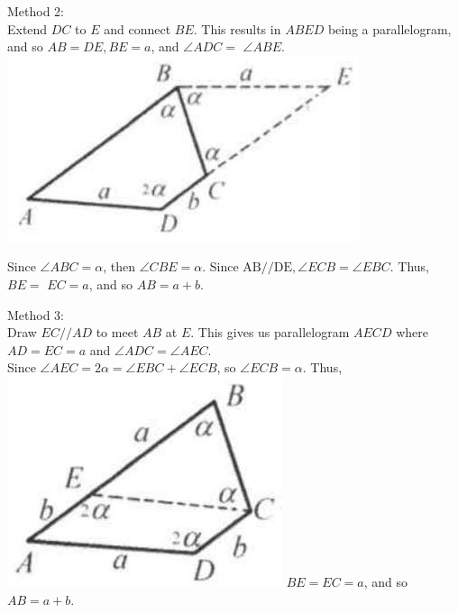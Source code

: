 \documentclass[10pt]{article}
\begin{document}
Method 2:\\
Extend \(D C\) to \(E\) and connect \(B E\). This results in \(A B E D\) being a parallelogram, and so \(A B=D E, B E=a\), and \(\angle A D C=\) \(\angle A B E\).\\
\includegraphics[max width=\textwidth, center]{2025_04_17_97bc1f7e44d93c271a88g-110(1)}


Since \(\angle A B C=\alpha\), then \(\angle C B E=\alpha\). Since \(\mathrm{AB} / / \mathrm{DE}, \angle E C B=\angle E B C\). Thus, \(B E=\) \(E C=a\), and so \(A B=a+b\).

Method 3:\\
Draw \(E C / / A D\) to meet \(A B\) at \(E\). This gives us parallelogram \(A E C D\) where \(A D=E C=a\) and \(\angle A D C=\angle A E C\).\\
Since \(\angle A E C=2 \alpha=\angle E B C+\angle E C B\), so \(\angle E C B=\alpha\). Thus,\\
\includegraphics[max width=\textwidth]{2025_04_17_97bc1f7e44d93c271a88g-111} \(B E=E C=a\), and so \(A B=a+b\).
\end{document}
